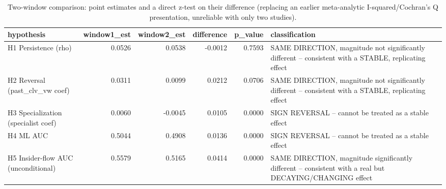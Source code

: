 \begin{table}
\caption{Two-window comparison: point estimates and a direct z-test on their difference (replacing an earlier meta-analytic I-squared/Cochran's Q presentation, unreliable with only two studies).}
\label{tab:window_comparison}
\begin{tabular}{lrrrrl}
\toprule
hypothesis & window1_est & window2_est & difference & p_value & classification \\
\midrule
H1 Persistence (rho) & 0.0526 & 0.0538 & -0.0012 & 0.7593 & SAME DIRECTION, magnitude not significantly different -- consistent with a STABLE, replicating effect \\
H2 Reversal (past_clv_vw coef) & 0.0311 & 0.0099 & 0.0212 & 0.0706 & SAME DIRECTION, magnitude not significantly different -- consistent with a STABLE, replicating effect \\
H3 Specialization (specialist coef) & 0.0060 & -0.0045 & 0.0105 & 0.0000 & SIGN REVERSAL -- cannot be treated as a stable effect \\
H4 ML AUC & 0.5044 & 0.4908 & 0.0136 & 0.0000 & SIGN REVERSAL -- cannot be treated as a stable effect \\
H5 Insider-flow AUC (unconditional) & 0.5579 & 0.5165 & 0.0414 & 0.0000 & SAME DIRECTION, magnitude significantly different -- consistent with a real but DECAYING/CHANGING effect \\
\bottomrule
\end{tabular}
\end{table}
